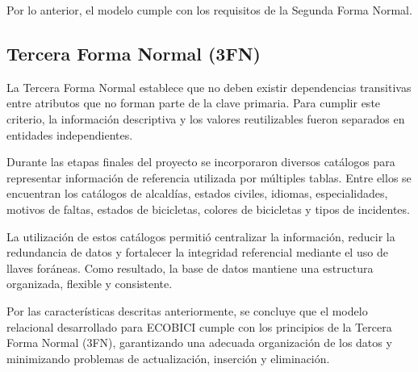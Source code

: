 Por lo anterior, el modelo cumple con los requisitos de la Segunda Forma Normal.

\subsection{Tercera Forma Normal (3FN)}

La Tercera Forma Normal establece que no deben existir dependencias transitivas entre atributos que no forman parte de la clave primaria. Para cumplir este criterio, la información descriptiva y los valores reutilizables fueron separados en entidades independientes.

Durante las etapas finales del proyecto se incorporaron diversos catálogos para representar información de referencia utilizada por múltiples tablas. Entre ellos se encuentran los catálogos de alcaldías, estados civiles, idiomas, especialidades, motivos de faltas, estados de bicicletas, colores de bicicletas y tipos de incidentes.

La utilización de estos catálogos permitió centralizar la información, reducir la redundancia de datos y fortalecer la integridad referencial mediante el uso de llaves foráneas. Como resultado, la base de datos mantiene una estructura organizada, flexible y consistente.

Por las características descritas anteriormente, se concluye que el modelo relacional desarrollado para ECOBICI cumple con los principios de la Tercera Forma Normal (3FN), garantizando una adecuada organización de los datos y minimizando problemas de actualización, inserción y eliminación.

